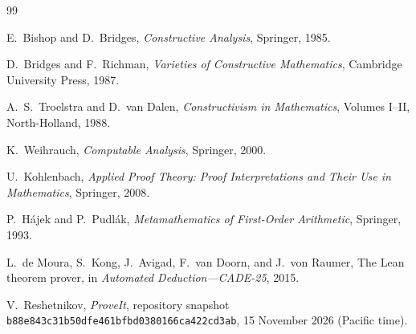 \documentclass[11pt]{article}
\newcommand{\code}[1]{\texttt{#1}}
\begin{document}
\appendix




\begin{thebibliography}{99}

E.~Bishop and D.~Bridges,
\emph{Constructive Analysis},
Springer, 1985.

D.~Bridges and F.~Richman,
\emph{Varieties of Constructive Mathematics},
Cambridge University Press, 1987.

A.~S.~Troelstra and D.~van Dalen,
\emph{Constructivism in Mathematics}, Volumes I--II,
North-Holland, 1988.

K.~Weihrauch,
\emph{Computable Analysis},
Springer, 2000.

U.~Kohlenbach,
\emph{Applied Proof Theory: Proof Interpretations and Their Use in Mathematics},
Springer, 2008.

P.~Hájek and P.~Pudlák,
\emph{Metamathematics of First-Order Arithmetic},
Springer, 1993.

L.~de Moura, S.~Kong, J.~Avigad, F.~van Doorn, and J.~von Raumer,
The Lean theorem prover,
in \emph{Automated Deduction---CADE-25}, 2015.

V.~Reshetnikov,
\emph{ProveIt}, repository snapshot
\code{b88e843c31b50dfe461bfbd0380166ca422cd3ab},
15 November 2026 (Pacific time).

\end{thebibliography}
\end{document}
